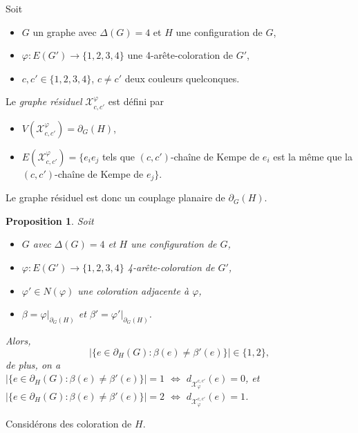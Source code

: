 \documentclass{beamer}
\newtheorem{proposition}{Proposition}
\begin{document}
\begin{frame}
Soit 
\begin{itemize}
\item $G$ un graphe avec $\Delta(G)=4$ et $H$ une configuration de $G$,
\item $\varphi:E(G')\to \{1,2,3,4\}$ une 4-arête-coloration de $G'$,
\item $c, c' \in \{1,2,3,4\}$, $c\ne c'$ deux couleurs quelconques. 
\end{itemize}



Le \emph{graphe résiduel}
$\mathcal{X}^{\varphi}_{c,c'}$ est défini par
\begin{itemize}
\item $V(\mathcal{X}^{\varphi}_{c,c'}) = \partial_G(H)$, 
\item $E(\mathcal{X}^{\varphi}_{c,c'}) = \{ e_ie_j$ tels que $(c,c')$-chaîne de Kempe de $e_i$ est la même que la $(c,c')$-chaîne de Kempe de $e_j\}$.
\end{itemize}

\pause

Le graphe résiduel est donc un couplage planaire de $\partial_G(H)$.
\end{frame}

\begin{frame}
\begin{proposition}
Soit 
\begin{itemize}
\item $G$ avec $\Delta(G)=4$ et $H$ une configuration de $G$,
\item $\varphi:E(G')\to \{1,2,3,4\}$ 4-arête-coloration de $G'$, 
\item $\varphi' \in N(\varphi)$ une coloration adjacente à $\varphi$,
\item $\beta = \varphi|_{\partial_G(H)}$ et $\beta' = \varphi'|_{\partial_G(H)}$.
\end{itemize}
Alors,
$$
|\{e\in \partial_H(G) : \beta(e)\ne \beta'(e)\}| \in \{1,2\},
$$
de plus, on a \\
$|\{e\in \partial_H(G) : \beta(e)\ne \beta'(e)\}|=1$ $\Leftrightarrow$ $d_{\mathcal{X}_{\varphi}^{c,c'}}(e)=0$, et \\
$|\{e\in \partial_H(G) : \beta(e)\ne \beta'(e)\}|=2$ $\Leftrightarrow$ $d_{\mathcal{X}_{\varphi}^{c,c'}}(e)=1$. 
\end{proposition}
\end{frame}

\begin{frame}
Considérons des coloration de $H$.
\end{frame}
\end{document}
